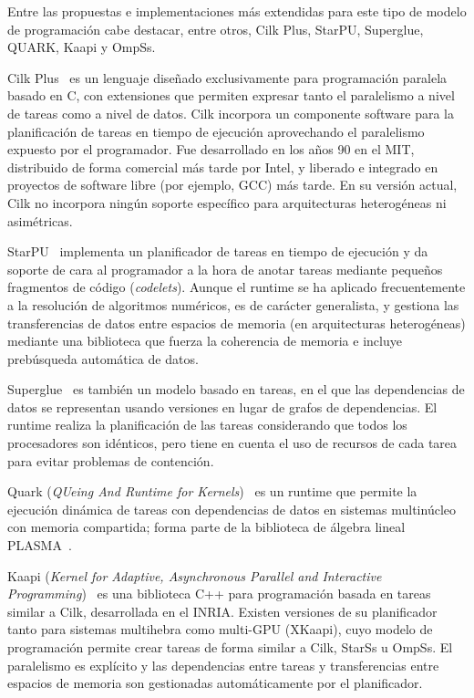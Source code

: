 Entre las propuestas e implementaciones más extendidas para este tipo de modelo de programación cabe
destacar, entre otros, Cilk Plus, StarPU, Superglue, QUARK, Kaapi y OmpSs. 

Cilk Plus~\cite{cilkweb,Blumofe:Cilk,Frigo:Cilk,Leiserson:Cilk} es un lenguaje diseñado exclusivamente
para programación paralela basado en C, con extensiones que permiten expresar tanto el paralelismo a nivel
de tareas como a nivel de datos. Cilk incorpora un componente software para la planificación de tareas
en tiempo de ejecución aprovechando el paralelismo expuesto por el programador. Fue desarrollado en los
años 90 en el MIT, distribuido de forma comercial más tarde por Intel, y liberado e integrado en proyectos
de software libre (por ejemplo, GCC) más tarde. En su versión actual, Cilk no incorpora ningún soporte 
específico para arquitecturas heterogéneas ni asimétricas.

StarPU~\cite{starpuweb,Augonnet:2011:SUP:1951453.1951454,agullo:hal-01223573,agullo:hal-01120507}
implementa un planificador de tareas en tiempo de ejecución y da soporte de
cara al programador a la hora de anotar tareas mediante pequeños fragmentos
de código ({\em codelets}). Aunque el runtime se ha aplicado frecuentemente
a la resolución de algoritmos numéricos, es de carácter generalista, y
gestiona las transferencias de datos entre espacios de memoria (en
arquitecturas heterogéneas) mediante una biblioteca que fuerza la coherencia
de memoria e incluye prebúsqueda automática de datos.

Superglue~\cite{superglueweb,tillenius:superglue,tillenius:superglue2} es
también un modelo basado en tareas, en el que las dependencias de datos se
representan usando versiones en lugar de grafos de dependencias. El runtime
realiza la planificación de las tareas considerando que todos los
procesadores son idénticos, pero tiene en cuenta el uso de recursos de cada
tarea para evitar problemas de contención.

Quark ({\em QUeing And Runtime for Kernels})~\cite{quarkweb,icl:609,Haidar}
es un runtime que permite la ejecución dinámica de tareas con dependencias
de datos en sistemas multinúcleo con memoria compartida; forma parte de la
biblioteca de álgebra lineal PLASMA~\cite{Abalenkovs}.

Kaapi ({\em Kernel for Adaptive, Asynchronous Parallel and Interactive Programming})~\cite{kaapiweb,Gautier:2013:XRS:2510661.2511383,Gautier:2007:KTS:1278177.1278182}
es una biblioteca C++ para programación basada en tareas similar a Cilk, desarrollada en el INRIA.
Existen versiones de su planificador tanto para sistemas multihebra como multi-GPU (XKaapi), cuyo
modelo de programación permite crear tareas de forma similar a Cilk, StarSs u OmpSs. El paralelismo
es explícito y las dependencias entre tareas y transferencias entre espacios de memoria son 
gestionadas automáticamente por el planificador.

